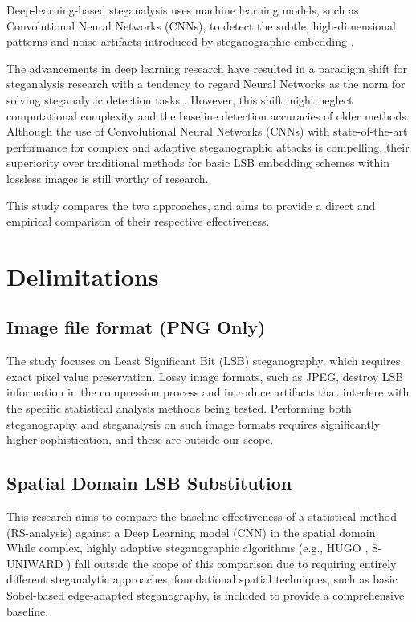 Deep-learning-based steganalysis uses machine learning models, such as Convolutional Neural Networks (CNNs), 
to detect the subtle, high-dimensional patterns and noise artifacts introduced by steganographic embedding \cite{Qian2015}. 

The advancements in deep learning research have resulted in a paradigm shift for steganalysis research with a 
tendency to regard Neural Networks as the norm for solving steganalytic detection tasks \cite{Qian2015, Selvaraj2021}. 
However, this shift might neglect computational complexity and the baseline detection accuracies of older methods.
Although the use of Convolutional Neural Networks (CNNs) with state-of-the-art performance for complex 
and adaptive steganographic attacks is compelling, their superiority over traditional methods for basic LSB embedding schemes 
within lossless images is still worthy of research.

This study compares the two approaches, and aims to provide a direct and empirical comparison of their respective effectiveness.


\section{Delimitations}

\subsection{Image file format (PNG Only)}
The study focuses on Least Significant Bit (LSB) steganography, which requires exact pixel value preservation. 
Lossy image formats, such as JPEG, destroy LSB information in the compression process and introduce artifacts that interfere with the 
specific statistical analysis methods being tested. Performing both steganography and steganalysis on such image formats requires significantly higher sophistication,
and these are outside our scope.

\subsection{Spatial Domain LSB Substitution}
This research aims to compare the baseline effectiveness of a statistical method (RS-analysis) against a Deep Learning model (CNN) in the spatial domain. 
While complex, highly adaptive steganographic algorithms (e.g., HUGO \cite{pevny2010using}, S-UNIWARD \cite{holub2014universal}) fall outside the scope of this comparison due to 
requiring entirely different steganalytic approaches, foundational spatial techniques, such as basic Sobel-based edge-adapted steganography, is included to provide a comprehensive baseline.

